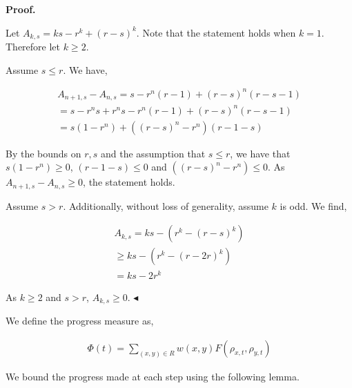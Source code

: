 \documentclass[10pt,a4paper]{article}
\begin{document}
\par\medskip\noindent\textbf{Proof.}\par




Let $A_{k,s}=ks-r^{k}+(r-s)^{k}$. Note that the statement holds when $k=1$. Therefore let $k\geq 2$.\par




Assume $s\leq r$. We have,\par


\[\begin{gathered}
\displaystyle A_{n+1,s}-A_{n,s} \displaystyle=s-r^{n}(r-1)+(r-s)^{n}(r-s-1) \\
\displaystyle=s-r^{n}s+r^{n}s-r^{n}(r-1)+(r-s)^{n}(r-s-1) \\
\displaystyle=s(1-r^{n})+((r-s)^{n}-r^{n})(r-1-s)
\end{gathered}\]


By the bounds on $r,s$ and the assumption that $s\leq r$, we have that $s(1-r^{n})\geq 0$, $(r-1-s)\leq 0$ and $((r-s)^{n}-r^{n})\leq 0$. As $A_{n+1,s}-A_{n,s}\geq 0$, the statement holds.\par




Assume $s>r$. Additionally, without loss of generality, assume $k$ is odd. We find,\par


\[\begin{gathered}
\displaystyle A_{k,s} \displaystyle=ks-(r^{k}-(r-s)^{k}) \\
\displaystyle\geq ks-(r^{k}-(r-2r)^{k}) \\
\displaystyle=ks-2r^{k}
\end{gathered}\]


As $k\geq 2$ and $s>r$, $A_{k,s}\geq 0$.
$\blacktriangleleft$\par




We define the progress measure as,\par


\[\begin{gathered}
\displaystyle\Phi(t)=\sum_{(x,y)\in R}w(x,y)F(\rho_{x,t},\rho_{y,t})
\end{gathered}\]




We bound the progress made at each step using the following lemma.\par
\end{document}
